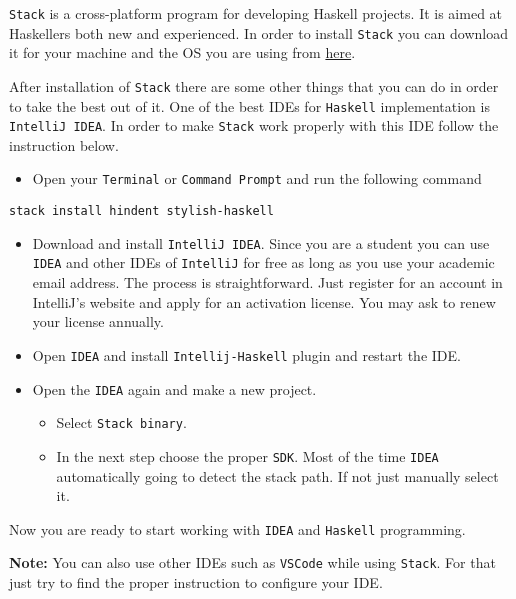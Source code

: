 \documentclass[11pt]{article}
\begin{document}
\texttt{Stack} is a cross-platform program for developing Haskell projects. It is
aimed at Haskellers both new and experienced. In order to install \texttt{Stack} you
can download it for your machine and the OS you are using from \href{https://docs.haskellstack.org/en/stable/README/}{here}.


After installation of \texttt{Stack} there are some other things that you can do in
order to take the best out of it. One of the best IDEs for \texttt{Haskell}
implementation is \texttt{IntelliJ IDEA}. In order to make \texttt{Stack} work properly
with this IDE follow the instruction below.

\begin{itemize}
\item Open your \texttt{Terminal} or \texttt{Command Prompt} and run the following command
\end{itemize}

\begin{verbatim}
stack install hindent stylish-haskell
\end{verbatim}
\begin{itemize}
\item Download and install \texttt{IntelliJ IDEA}. Since you are a student you can use
\texttt{IDEA} and other IDEs of \texttt{IntelliJ} for free as long as you use your
academic email address. The process is straightforward. Just register for
an account in IntelliJ's website and apply for an activation license. You may
ask to renew your license annually.
\item Open \texttt{IDEA} and install \texttt{Intellij-Haskell} plugin and restart the IDE.
\item Open the \texttt{IDEA} again and make a new project.
\begin{itemize}
\item Select \texttt{Stack binary}.
\item In the next step choose the proper \texttt{SDK}. Most of the time \texttt{IDEA}
automatically going to detect the stack path. If not just manually select
it.
\end{itemize}
\end{itemize}

Now you are ready to start working with \texttt{IDEA} and \texttt{Haskell} programming.

\textbf{Note:} You can also use other IDEs such as \texttt{VSCode} while using \texttt{Stack}. For
that just try to find the proper instruction to configure your IDE.
\end{document}
